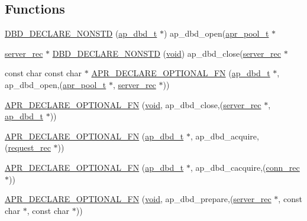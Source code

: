 \subsection*{Functions}
\begin{DoxyCompactItemize}
\item 
\hyperlink{group__MOD__DBD_ga7434524f0aad6f9427e59cf5f49a0b9e}{D\+B\+D\+\_\+\+D\+E\+C\+L\+A\+R\+E\+\_\+\+N\+O\+N\+S\+TD} (\hyperlink{structap__dbd__t}{ap\+\_\+dbd\+\_\+t} $\ast$) ap\+\_\+dbd\+\_\+open(\hyperlink{structapr__pool__t}{apr\+\_\+pool\+\_\+t} $\ast$
\item 
\hyperlink{structserver__rec}{server\+\_\+rec} $\ast$ \hyperlink{group__MOD__DBD_ga5919d44a86a23cf689713cb0419d53d2}{D\+B\+D\+\_\+\+D\+E\+C\+L\+A\+R\+E\+\_\+\+N\+O\+N\+S\+TD} (\hyperlink{group__MOD__ISAPI_gacd6cdbf73df3d9eed42fa493d9b621a6}{void}) ap\+\_\+dbd\+\_\+close(\hyperlink{structserver__rec}{server\+\_\+rec} $\ast$
\item 
const char const char $\ast$ \hyperlink{group__MOD__DBD_ga918042a10ca48d38260977731cb15466}{A\+P\+R\+\_\+\+D\+E\+C\+L\+A\+R\+E\+\_\+\+O\+P\+T\+I\+O\+N\+A\+L\+\_\+\+FN} (\hyperlink{structap__dbd__t}{ap\+\_\+dbd\+\_\+t} $\ast$, ap\+\_\+dbd\+\_\+open,(\hyperlink{structapr__pool__t}{apr\+\_\+pool\+\_\+t} $\ast$, \hyperlink{structserver__rec}{server\+\_\+rec} $\ast$))
\item 
\hyperlink{group__MOD__DBD_gadfc607ac1d480413061fcfbf362086a7}{A\+P\+R\+\_\+\+D\+E\+C\+L\+A\+R\+E\+\_\+\+O\+P\+T\+I\+O\+N\+A\+L\+\_\+\+FN} (\hyperlink{group__MOD__ISAPI_gacd6cdbf73df3d9eed42fa493d9b621a6}{void}, ap\+\_\+dbd\+\_\+close,(\hyperlink{structserver__rec}{server\+\_\+rec} $\ast$, \hyperlink{structap__dbd__t}{ap\+\_\+dbd\+\_\+t} $\ast$))
\item 
\hyperlink{group__MOD__DBD_gacd2200d665ceac05ac24653dd42829c2}{A\+P\+R\+\_\+\+D\+E\+C\+L\+A\+R\+E\+\_\+\+O\+P\+T\+I\+O\+N\+A\+L\+\_\+\+FN} (\hyperlink{structap__dbd__t}{ap\+\_\+dbd\+\_\+t} $\ast$, ap\+\_\+dbd\+\_\+acquire,(\hyperlink{structrequest__rec}{request\+\_\+rec} $\ast$))
\item 
\hyperlink{group__MOD__DBD_gab74eaa5981dec85f7f050a86f498ee05}{A\+P\+R\+\_\+\+D\+E\+C\+L\+A\+R\+E\+\_\+\+O\+P\+T\+I\+O\+N\+A\+L\+\_\+\+FN} (\hyperlink{structap__dbd__t}{ap\+\_\+dbd\+\_\+t} $\ast$, ap\+\_\+dbd\+\_\+cacquire,(\hyperlink{structconn__rec}{conn\+\_\+rec} $\ast$))
\item 
\hyperlink{group__MOD__DBD_gac1a60f06b87980ccaff774ef690262b4}{A\+P\+R\+\_\+\+D\+E\+C\+L\+A\+R\+E\+\_\+\+O\+P\+T\+I\+O\+N\+A\+L\+\_\+\+FN} (\hyperlink{group__MOD__ISAPI_gacd6cdbf73df3d9eed42fa493d9b621a6}{void}, ap\+\_\+dbd\+\_\+prepare,(\hyperlink{structserver__rec}{server\+\_\+rec} $\ast$, const char $\ast$, const char $\ast$))
\end{DoxyCompactItemize}


